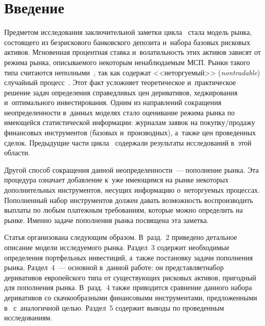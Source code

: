 
  



\thispagestyle{headings}

\begin{multicols}{2}

\label{st\stat}


\section{Введение}

Предметом исследования заключительной заметки цикла~\cite{B_23_1_IA, B_23_2_IA, B_23_3_IA, B_23_4_IA} 
стала модель рынка, состоящего из безрискового банковского депозита и~набора базовых рисковых активов. 
Мгновенная \mbox{процентная} ставка и~волатильность этих активов зависят от режима рынка, описываемого некоторым 
ненаблюдаемым МСП. Рынки такого типа считаются неполными~\cite{Criens_20}, 
так как содержат <<не\-тор\-гу\-емый>> (\textit{nontradable}) случайный процесс~\cite{Fouque_00}. 
Этот факт усложняет теоретическое и~практическое решение задач определения справедливых цен деривативов, 
хеджирования и~оптимального инвестирования. Одним из на\-прав\-ле\-ний сокращения не\-опре\-де\-лен\-ности в~данных моделях  стало 
оценивание режима рынка по имеющейся статистической информации: журналам заявок на по\-куп\-ку/про\-да\-жу 
финансовых инструментов (базовых и~производных), а~так\-же цен проведенных сделок. Предыду\-щие час\-ти цик\-ла~\cite{B_23_1_IA, B_23_3_IA, B_23_4_IA} 
содержали результаты исследований в~этой об\-ласти.

Другой способ сокращения данной неопределенности~--- 
пополнение рынка. Эта процедура означает добавление к~уже имеющимся на рынке некоторых дополнительных инструментов, несущих информацию 
о~неторгуемых процессах. Пополненный набор инструментов должен давать возможность воспроизводить выплаты по любым платежным 
требованиям, которые можно определить на рынке. Именно задаче пополнения рынка посвящена эта заметка.

Статья организована следующим образом. В~разд.~2 
приведено детальное описание модели исследуемого рынка. Раздел~3 содержит необхо\-димые определения портфельных инвестиций,\linebreak 
а~также %
постановку задачи пополнения рынка. Раздел~4~--- основной в~данной работе: 
он представляет\linebreak набор деривативов европейского типа от су\-щест\-ву\-ющих рисковых активов, пригодный для пополнения рынка. 
В~разд.~4 также приводится сравнение данного набора деривативов со \mbox{скачкообразными} финансовыми инструментами, предложенными 
в~\cite{Courcuera_05, ZhangElliottSiuGuo_11} с~аналогичной целью. Раздел~5 содержит выводы по проведенным исследованиям.



\end{multicols}
